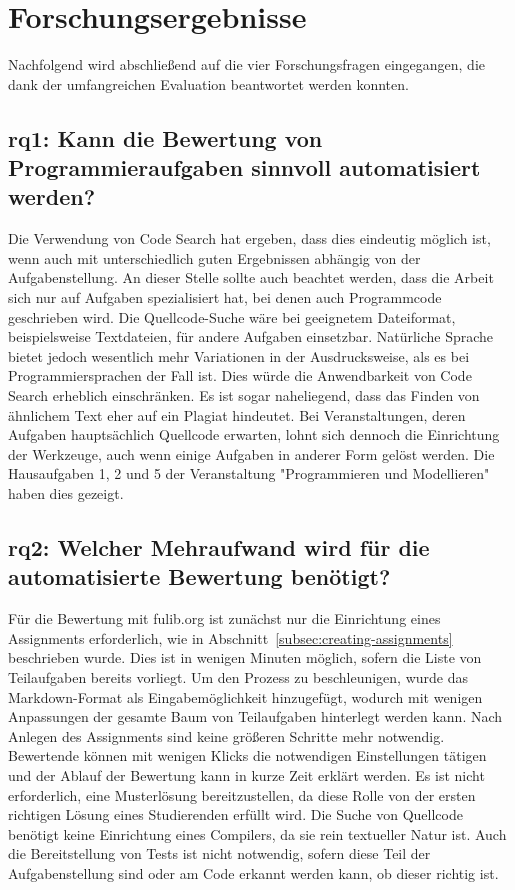 \section{Forschungsergebnisse}\label{sec:research-results}

Nachfolgend wird abschließend auf die vier Forschungsfragen eingegangen, die dank der umfangreichen Evaluation beantwortet werden konnten.

\subsection[\acs{rq}1]{\ac{rq}1: Kann die Bewertung von Programmieraufgaben sinnvoll automatisiert werden?}\label{subsec:ra1-useful-automation}

Die Verwendung von Code Search hat ergeben, dass dies eindeutig möglich ist, wenn auch mit unterschiedlich guten Ergebnissen abhängig von der Aufgabenstellung.
An dieser Stelle sollte auch beachtet werden, dass die Arbeit sich nur auf Aufgaben spezialisiert hat, bei denen auch Programmcode geschrieben wird.
Die Quellcode-Suche wäre bei geeignetem Dateiformat, beispielsweise Textdateien, für andere Aufgaben einsetzbar.
Natürliche Sprache bietet jedoch wesentlich mehr Variationen in der Ausdrucksweise, als es bei Programmiersprachen der Fall ist.
Dies würde die Anwendbarkeit von Code Search erheblich einschränken.
Es ist sogar naheliegend, dass das Finden von ähnlichem Text eher auf ein Plagiat hindeutet.
Bei Veranstaltungen, deren Aufgaben hauptsächlich Quellcode erwarten, lohnt sich dennoch die Einrichtung der Werkzeuge, auch wenn einige Aufgaben in anderer Form gelöst werden.
Die Hausaufgaben 1, 2 und 5 der Veranstaltung "Programmieren und Modellieren" haben dies gezeigt.

\subsection[\acs{rq}2]{\ac{rq}2: Welcher Mehraufwand wird für die automatisierte Bewertung benötigt?}\label{subsec:ra2-additional-effort}

Für die Bewertung mit fulib.org ist zunächst nur die Einrichtung eines Assignments erforderlich, wie in Abschnitt~\ref{subsec:creating-assignments} beschrieben wurde.
Dies ist in wenigen Minuten möglich, sofern die Liste von Teilaufgaben bereits vorliegt.
Um den Prozess zu beschleunigen, wurde das Markdown-Format als Eingabemöglichkeit hinzugefügt, wodurch mit wenigen Anpassungen der gesamte Baum von Teilaufgaben hinterlegt werden kann.
Nach Anlegen des Assignments sind keine größeren Schritte mehr notwendig.
Bewertende können mit wenigen Klicks die notwendigen Einstellungen tätigen und der Ablauf der Bewertung kann in kurze Zeit erklärt werden.
Es ist nicht erforderlich, eine Musterlösung bereitzustellen, da diese Rolle von der ersten richtigen Lösung eines Studierenden erfüllt wird.
Die Suche von Quellcode benötigt keine Einrichtung eines Compilers, da sie rein textueller Natur ist.
Auch die Bereitstellung von Tests ist nicht notwendig, sofern diese Teil der Aufgabenstellung sind oder am Code erkannt werden kann, ob dieser richtig ist.

